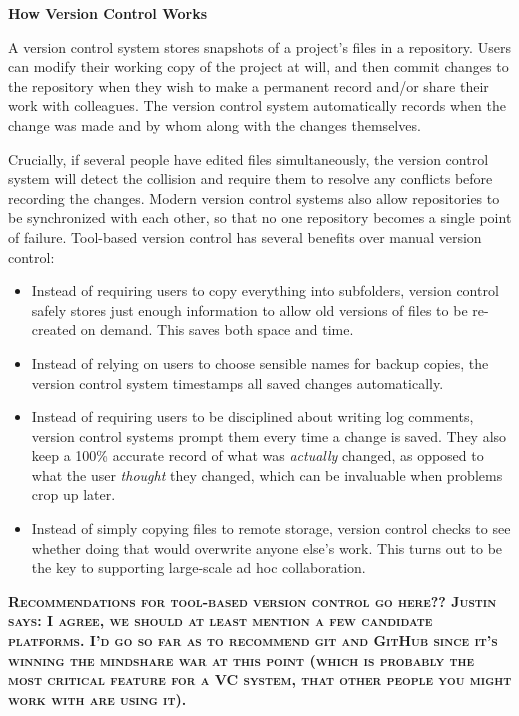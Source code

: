 \documentclass[10pt]{article}
\newcommand{\fixme}[1]{\textsc{\textbf{#1}}}
\begin{document}
\begin{framed}
  \noindent \textbf{How Version Control Works}

  A version control system stores snapshots of a project's files in a
  repository. Users can modify their working copy of the project at will,
  and then commit changes to the repository when they wish to make a
  permanent record and/or share their work with colleagues. The version
  control system automatically records when the change was made and by
  whom along with the changes themselves.
  
  Crucially, if several people have edited files simultaneously, the
  version control system will detect the collision and require them to
  resolve any conflicts before recording the changes. Modern version
  control systems also allow repositories to be synchronized with each
  other, so that no one repository becomes a single point of failure.
  Tool-based version control has several benefits over manual version
  control:

  \begin{itemize}
  \item
    Instead of requiring users to copy everything into subfolders, version
    control safely stores just enough information to allow old versions of
    files to be re-created on demand. This saves both space and time.
  \item
    Instead of relying on users to choose sensible names for backup
    copies, the version control system timestamps all saved changes
    automatically.
  \item
    Instead of requiring users to be disciplined about writing log
    comments, version control systems prompt them every time a change is
    saved. They also keep a 100\% accurate record of what was
    \emph{actually} changed, as opposed to what the user \emph{thought}
    they changed, which can be invaluable when problems crop up later.
  \item
    Instead of simply copying files to remote storage, version control
    checks to see whether doing that would overwrite anyone else's work.
    This turns out to be the key to supporting large-scale ad hoc
    collaboration.
  \end{itemize}
\end{framed}

\fixme{Recommendations for tool-based version control go here?? Justin says: I agree, we should at least mention a few candidate platforms. I'd go so far as to recommend git and GitHub since it's winning the mindshare war at this point (which is probably the most critical feature for a VC system, that other people you might work with are using it).}
\end{document}
